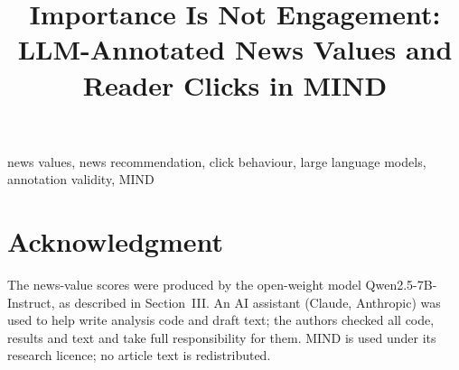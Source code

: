 \documentclass[conference]{IEEEtran}
\begin{document}
\title{Importance Is Not Engagement: LLM-Annotated News Values and Reader Clicks in MIND}

\author{
}

\maketitle

\begin{abstract}

\end{abstract}

\begin{IEEEkeywords}
news values, news recommendation, click behaviour, large language models, annotation validity, MIND
\end{IEEEkeywords}



\section*{Acknowledgment}
The news-value scores were produced by the open-weight model Qwen2.5-7B-Instruct, as described in Section~III. An AI assistant (Claude, Anthropic) was used to help write analysis code and draft text; the authors checked all code, results and text and take full responsibility for them. MIND is used under its research licence; no article text is redistributed.



\end{document}
